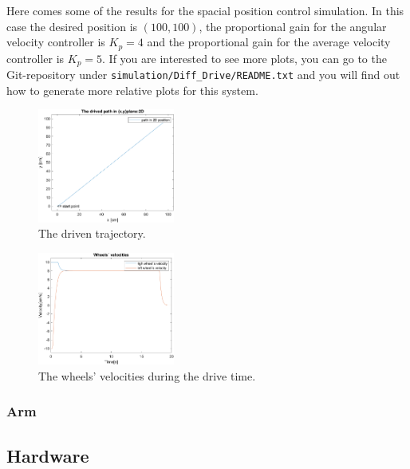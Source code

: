 Here comes some of the results for the spacial position control simulation. In this case the desired position is $(100, 100)$, the proportional gain for the angular velocity controller is $K_p = 4$ and the proportional gain for the average velocity controller is $K_p = 5$. If you are interested to see more plots, you can go to the Git-repository under \texttt{simulation/Diff\_Drive/README.txt} and you will find out how to generate more relative plots for this system.

\begin{figure}[h]
\centering
\includegraphics[width=0.4\textwidth]{sections/assets/traj.png}
\caption{The driven trajectory.}
\end{figure}

\begin{figure}[h]
\centering
\includegraphics[width=0.4\textwidth]{sections/assets/WV.png}
\caption{The wheels' velocities during the drive time.}
\end{figure}

\subsubsection{Arm}

\subsection{Hardware}
